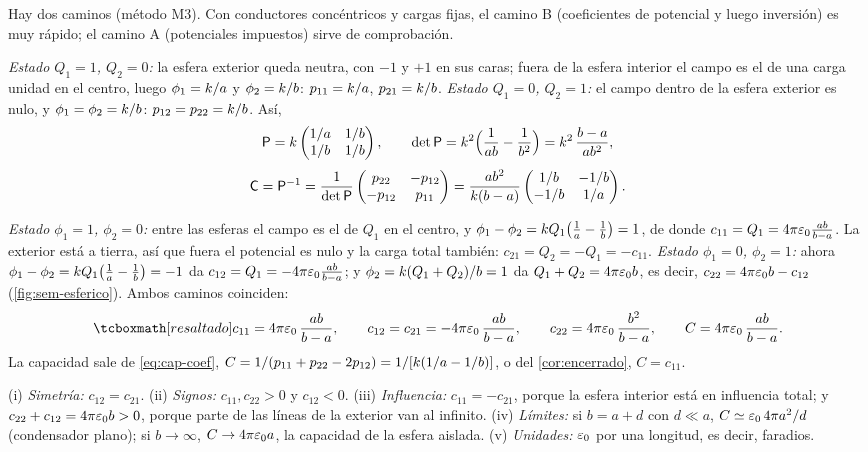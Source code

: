 \begin{resolucion}
 Hay dos caminos (método M3). Con conductores concéntricos y cargas fijas, el camino B (coeficientes de potencial y luego inversión) es muy
rápido; el camino A (potenciales impuestos) sirve de comprobación.

 \emph{Estado $Q_1=1$, $Q_2=0$:} la esfera exterior queda neutra, con $-1$ y $+1$ en sus caras; fuera de la esfera
interior el campo es el de una carga unidad en el centro, luego $\phi_1=k/a$ y $\phi_2=k/b$: $p_{11}=k/a$, $p_{21}=k/b$. \emph{Estado $Q_1=0$, $Q_2=1$:} el
campo dentro de la esfera exterior es nulo, y $\phi_1=\phi_2=k/b$: $p_{12}=p_{22}=k/b$. Así,
\[
  \mathsf{P}=k\begin{pmatrix}1/a & 1/b\\ 1/b & 1/b\end{pmatrix},\qquad\det\mathsf{P}=k^{2}\Bigl(\frac{1}{ab}-\frac{1}{b^{2}}\Bigr)=k^{2}\,\frac{b-a}{ab^{2}},
\]
\[
  \mathsf{C}=\mathsf{P}^{-1}=\frac{1}{\det\mathsf{P}}\begin{pmatrix}p_{22} & -p_{12}\\ -p_{12} & p_{11}\end{pmatrix}
  =\frac{ab^{2}}{k(b-a)}\begin{pmatrix}1/b & -1/b\\ -1/b & 1/a\end{pmatrix}.
\]

 \emph{Estado $\phi_1=1$, $\phi_2=0$:} entre las esferas el campo es el de $Q_1$ en el centro, y
$\phi_1-\phi_2=k Q_1\bigl(\frac1a-\frac1b\bigr)=1$, de donde $c_{11}=Q_1=4\pi\varepsilon_{0}\frac{ab}{b-a}$. La exterior está a tierra, así que fuera el potencial es nulo y la
carga total también: $c_{21}=Q_2=-Q_1=-c_{11}$. \emph{Estado $\phi_1=0$, $\phi_2=1$:} ahora $\phi_1-\phi_2=k Q_1\bigl(\frac1a-\frac1b\bigr)=-1$ da
$c_{12}=Q_1=-4\pi\varepsilon_{0}\frac{ab}{b-a}$; y $\phi_2=k(Q_1+Q_2)/b=1$ da $Q_1+Q_2=4\pi\varepsilon_{0} b$, es decir, $c_{22}=4\pi\varepsilon_{0} b-c_{12}$ (\cref{fig:sem-esferico}).
Ambos caminos coinciden:
\[
  \resalta{c_{11}=4\pi\eo\,\frac{ab}{b-a},\qquad c_{12}=c_{21}=-4\pi\eo\,\frac{ab}{b-a},\qquad c_{22}=4\pi\eo\,\frac{b^{2}}{b-a},\qquad C=4\pi\eo\,\frac{ab}{b-a}.}
\]
La capacidad sale de \cref{eq:cap-coef}, $C=1/(p_{11}+p_{22}-2p_{12})=1/[k(1/a-1/b)]$, o del \cref{cor:encerrado}, $C=c_{11}$.
\end{resolucion}



\begin{observacion}\label{obs:sem-esferico}
(i) \emph{Simetría:} $c_{12}=c_{21}$. (ii) \emph{Signos:} $c_{11},c_{22}>0$ y $c_{12}<0$. (iii) \emph{Influencia:} $c_{11}=-c_{21}$, porque la esfera interior está
en influencia total; y $c_{22}+c_{12}=4\pi\varepsilon_{0} b>0$, porque parte de las líneas de la exterior van al infinito. (iv) \emph{Límites:} si $b=a+d$ con $d\ll a$,
$C\simeq\varepsilon_{0}\,4\pi a^{2}/d$ (condensador plano); si $b\to\infty$, $C\to4\pi\varepsilon_{0} a$, la capacidad de la esfera aislada. (v) \emph{Unidades:} $\varepsilon_{0}$ por una
longitud, es decir, faradios.
\end{observacion}

